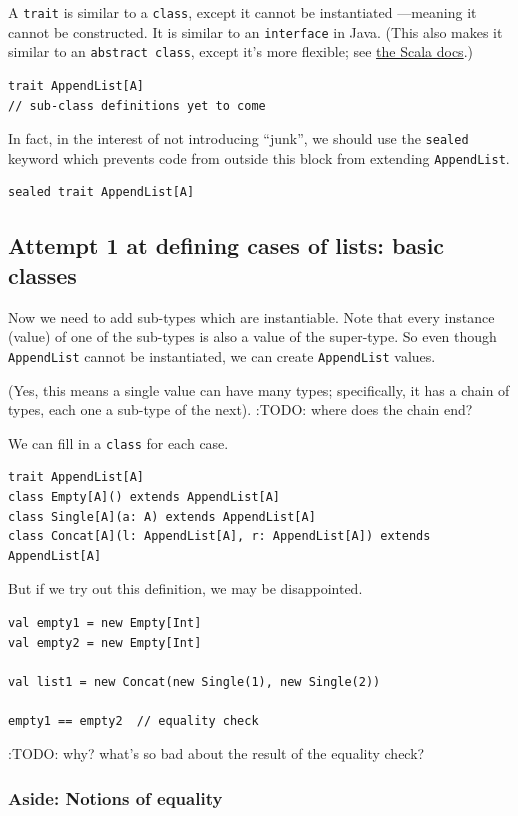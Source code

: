 \documentclass[11pt]{article}
\begin{document}
A \texttt{trait} is similar to a \texttt{class}, except it cannot be instantiated
—meaning it cannot be constructed.
It is similar to an \texttt{interface} in Java.
(This also makes it similar to an \texttt{abstract class},
except it's more flexible; see
\href{https://docs.scala-lang.org/overviews/scala-book/abstract-classes.html}{the Scala docs}.)
\begin{verbatim}
trait AppendList[A]
// sub-class definitions yet to come
\end{verbatim}

In fact, in the interest of not introducing “junk”,
we should use the \texttt{sealed} keyword which prevents code
from outside this block from extending \texttt{AppendList}.
\begin{verbatim}
sealed trait AppendList[A]
\end{verbatim}

\subsection{Attempt 1 at defining cases of lists: basic classes}
\label{sec:orgea12cf9}
Now we need to add sub-types which are instantiable.
Note that every instance (value) of one of the sub-types
is also a value of the super-type.
So even though \texttt{AppendList} cannot be instantiated,
we can create \texttt{AppendList} values.

(Yes, this means a single value can have many types;
specifically, it has a chain of types, each one a sub-type of the next).
:TODO: where does the chain end?

We can fill in a \texttt{class} for each case.
\begin{verbatim}
trait AppendList[A]
class Empty[A]() extends AppendList[A]
class Single[A](a: A) extends AppendList[A]
class Concat[A](l: AppendList[A], r: AppendList[A]) extends AppendList[A]
\end{verbatim}

But if we try out this definition, we may be disappointed.
\begin{verbatim}
val empty1 = new Empty[Int]
val empty2 = new Empty[Int]

val list1 = new Concat(new Single(1), new Single(2))

empty1 == empty2  // equality check
\end{verbatim}
:TODO: why? what's so bad about the result of the equality check?

\subsubsection{Aside: Notions of equality}
\label{sec:org5768a5e}
\end{document}
